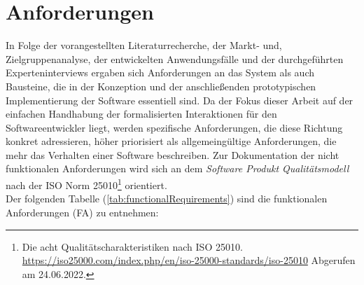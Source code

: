 \section{Anforderungen}
\label{sec:requirementsFinal}
    In Folge der vorangestellten Literaturrecherche, der Markt- und, Zielgruppenanalyse, der entwickelten Anwendungsfälle und 
    der durchgeführten Experteninterviews ergaben sich Anforderungen an das System als auch Bausteine, die in der 
    Konzeption und der anschließenden prototypischen Implementierung der Software essentiell sind. Da der Fokus dieser 
    Arbeit auf der einfachen Handhabung der formalisierten Interaktionen für den Softwareentwickler liegt, werden 
    spezifische Anforderungen, die diese Richtung konkret adressieren, höher priorisiert als allgemeingültige Anforderungen, die mehr das 
    Verhalten einer Software beschreiben. Zur Dokumentation der nicht funktionalen Anforderungen wird sich an dem 
    \textit{Software Produkt Qualitätsmodell} nach der ISO Norm 25010\footnote{Die acht Qualitätscharakteristiken nach ISO 25010. \url{https://iso25000.com/index.php/en/iso-25000-standards/iso-25010} Abgerufen am 24.06.2022.} 
    orientiert. 
    \\
    \linebreak
    Der folgenden Tabelle (\ref{tab:functionalRequirements}) sind die funktionalen Anforderungen (FA) zu entnehmen: 
